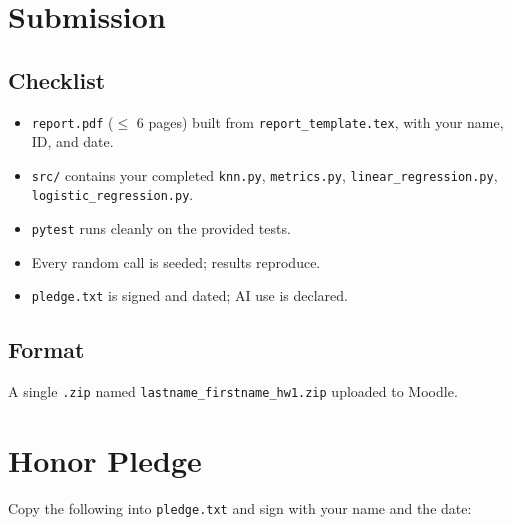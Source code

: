 \documentclass[11pt,a4paper]{article}
\begin{document}
\section{Submission}\label{sec:submission}
\subsection{Checklist}
\begin{itemize}[topsep=2pt,itemsep=1pt]
  \item[$\square$] \texttt{report.pdf} ($\le$ 6 pages) built from \texttt{report\_template.tex}, with your name, ID, and date.
  \item[$\square$] \texttt{src/} contains your completed \texttt{knn.py}, \texttt{metrics.py}, \texttt{linear\_regression.py}, \texttt{logistic\_regression.py}.
  \item[$\square$] \texttt{pytest} runs cleanly on the provided tests.
  \item[$\square$] Every random call is seeded; results reproduce.
  \item[$\square$] \texttt{pledge.txt} is signed and dated; AI use is declared.
\end{itemize}

\subsection{Format}
A single \texttt{.zip} named \texttt{lastname\_firstname\_hw1.zip} uploaded to Moodle.

\section{Honor Pledge}\label{sec:pledge}
Copy the following into \texttt{pledge.txt} and sign with your name and the date:

\end{document}
